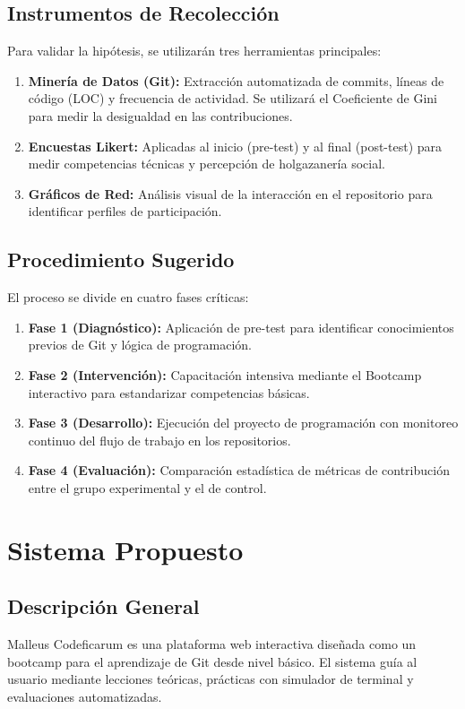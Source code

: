 \documentclass[12pt,a4paper]{article}
\begin{document}
 \subsection{Instrumentos de Recolección}
 Para validar la hipótesis, se utilizarán tres herramientas principales:
 \begin{enumerate}
     \item \textbf{Minería de Datos (Git):} Extracción automatizada de commits, líneas de código (LOC) y frecuencia de actividad. Se utilizará el Coeficiente de Gini para medir la desigualdad en las contribuciones.
     \item \textbf{Encuestas Likert:} Aplicadas al inicio (pre-test) y al final (post-test) para medir competencias técnicas y percepción de holgazanería social.
     \item \textbf{Gráficos de Red:} Análisis visual de la interacción en el repositorio para identificar perfiles de participación.
 \end{enumerate}
 
 \subsection{Procedimiento Sugerido}
 El proceso se divide en cuatro fases críticas:
 \begin{enumerate}
     \item \textbf{Fase 1 (Diagnóstico):} Aplicación de pre-test para identificar conocimientos previos de Git y lógica de programación.
     \item \textbf{Fase 2 (Intervención):} Capacitación intensiva mediante el Bootcamp interactivo para estandarizar competencias básicas.
     \item \textbf{Fase 3 (Desarrollo):} Ejecución del proyecto de programación con monitoreo continuo del flujo de trabajo en los repositorios.
     \item \textbf{Fase 4 (Evaluación):} Comparación estadística de métricas de contribución entre el grupo experimental y el de control.
 \end{enumerate}
 
\section{Sistema Propuesto}

\subsection{Descripción General}
Malleus Codeficarum es una plataforma web interactiva diseñada como un bootcamp para el aprendizaje de Git desde nivel básico. El sistema guía al usuario mediante lecciones teóricas, prácticas con simulador de terminal y evaluaciones automatizadas.
\end{document}
